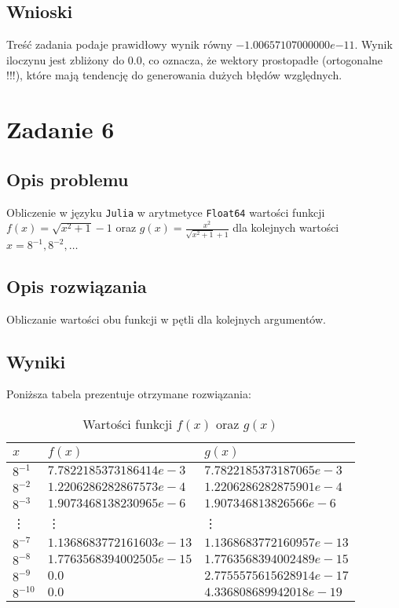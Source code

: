 \documentclass{classrep}
\begin{document}
	\subsection{Wnioski}
		Treść zadania podaje prawidłowy wynik równy $-1.00657107000000e{-11}$.
		Wynik iloczynu jest zbliżony do $0.0$, co oznacza, że wektory prostopadłe (ortogonalne !!!), które mają tendencję do generowania dużych błędów
		względnych.
\section{Zadanie 6}
	\subsection{Opis problemu}
		Obliczenie w języku \texttt{Julia} w arytmetyce \texttt{Float64} wartości funkcji 
		$f(x)=\sqrt{x^2 + 1} - 1$ oraz $g(x)=\frac{x^2}{\sqrt{x^2+1}+1}$  dla kolejnych wartości 
		$x=8^{-1},8^{-2},\dots$
	\subsection{Opis rozwiązania}
		Obliczanie wartości obu funkcji w pętli dla kolejnych argumentów.
	\subsection{Wyniki}
		Poniższa tabela prezentuje otrzymane rozwiązania:
		\begin{table}[h!]
        	\centering
        	\footnotesize
			\begin{tabular}{lll} \toprule
				$x$ & $f(x)$ & $g(x)$ \\ \midrule
				$8^{-1}$ & $7.7822185373186414e-3$ & $7.7822185373187065e-3$ \\ 
 				$8^{-2}$ & $1.2206286282867573e-4$ & $1.2206286282875901e-4$ \\
 				$8^{-3}$ & $1.9073468138230965e-6$ & $1.907346813826566e-6$ \\
 				\vdots & \vdots & \vdots \\
 				$8^{-7}$ & $1.1368683772161603e-13$ & $1.1368683772160957e-13$ \\
 				$8^{-8}$ & $1.7763568394002505e-15$ & $1.7763568394002489e-15$ \\
 				$8^{-9}$ & $0.0$ & $2.7755575615628914e-17$ \\
 				$8^{-10}$ & $0.0$ & $4.336808689942018e-19$ \\\bottomrule
 			\end{tabular}
 			\caption{Wartości funkcji $f(x)$ oraz $g(x)$}
			\label{table:9}
		\end{table}
	
\end{document}
